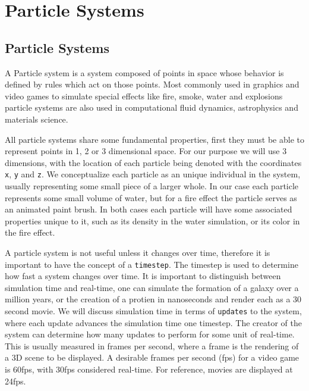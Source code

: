 \chapter{Particle Systems}

\section{Particle Systems}
A Particle system is a system composed of points in space whose behavior is
defined by rules which act on those points. Most commonly used in graphics and
video games to simulate special effects like fire, smoke, water and explosions
particle systems are also used in computational fluid dynamics, astrophysics
and materials science. 


All particle systems share some fundamental properties, first they must be able
to represent points in 1, 2 or 3 dimensional space. For our purpose we will use
3 dimensions, with the location of each particle being denoted with the
coordinates \verb|x|, \verb|y| and \verb|z|. We conceptualize each particle as
an unique individual in the system, usually representing some small piece of a
larger whole. In our case each particle represents some small volume of water,
but for a fire effect the particle serves as an animated paint brush. In both
cases each particle will have some associated properties unique to it, such as
its density in the water simulation, or its color in the fire effect.


A particle system is not useful unless it changes over time, therefore it is
important to have the concept of a \verb|timestep|. The timestep is used to
determine how fast a system changes over time. It is important to distinguish
between simulation time and real-time, one can simulate the formation of a
galaxy over a million years, or the creation of a protien in nanoseconds and
render each as a 30 second movie. We will discuss simulation time in terms of
\verb|updates| to the system, where each update advances the simulation time
one timestep. The creator of the system can determine how many updates to
perform for some unit of real-time. This is usually measured in frames per
second, where a frame is the rendering of a 3D scene to be displayed. A
desirable frames per second (fps) for a video game is 60fps, with 30fps
considered real-time. For reference, movies are displayed at 24fps. 


